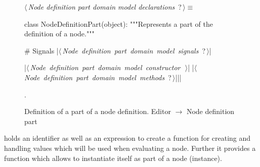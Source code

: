 \documentclass[%
    a4paper,    %
    justified,  %
    nobib,      %
    openany     %
]{tufte-book}
\makeatletter
\renewcommand{\label}[1]{\@tufte@label{##1}}%
\makeatother
\begin{document}
\begin{figure}
\begin{flushleft} \small
\begin{minipage}{\linewidth}\label{scrap109}\raggedright\small
{} $\langle\,${\itshape Node definition part domain model declarations}\nobreak\ {\footnotesize {?}}$\,\rangle\equiv$
\vspace{-1ex}
\begin{pythoncode}
class NodeDefinitionPart(object):
    """Represents a part of the definition of a node."""

    # Signals
    |\hbox{$\langle\,${\itshape Node definition part domain model signals}\nobreak\ {\footnotesize ?}$\,\rangle$}|

    |\hbox{$\langle\,${\itshape Node definition part domain model constructor}\nobreak\ {\footnotesize {}}$\,\rangle$}|
    |\hbox{$\langle\,${\itshape Node definition part domain model methods}\nobreak\ {\footnotesize ?}$\,\rangle$}||\NWsep|
\end{pythoncode}
\vspace{1.5ex}
\footnotesize
\begin{list}{}{\setlength{\itemsep}{-\parsep}\setlength{\itemindent}{-\leftmargin}}
\item {\NWtxtMacroNoRef}.

\item{}
\end{list}
\end{minipage}\vspace{4ex}
\end{flushleft}
\caption{Definition of a part of a node definition.
  \newline{}\newline{}Editor $\rightarrow$ Node definition part}
\label{editor:lst:node-definition-part}
\end{figure}

 holds an identifier as well as an
expression to create a function for creating and handling values which will be
used when evaluating a node. Further it provides a function which allows to
instantiate itself as part of a node (instance).
\end{document}
